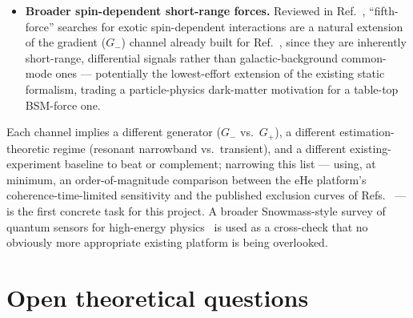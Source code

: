 \documentclass[aps,prxquantum,reprint,superscriptaddress,longbibliography]{revtex4-2}
\begin{document}
\begin{itemize}
  across the trap, combined with a comagnetometer-style oscillating readout, is the standard EDM
  protocol~\cite{aoki2021quantum}; entangled-sensor EDM proposals in trapped-atom systems report
  projected sensitivity below $10^{-30}\,e\cdot{\rm cm}$. This channel is intermediate between the
  original static-gradient proposal (a static source field) and the oscillating targets above (an
  oscillating readout is still required to reject systematics), and would need its own assessment of
  whether the eHe platform's achievable $E$-field and coherence time are competitive.
  \item \textbf{Broader spin-dependent short-range forces.} Reviewed in
  Ref.~\cite{jiang2024searches}, ``fifth-force'' searches for exotic spin-dependent interactions are a
  natural extension of the gradient ($G_-$) channel already built for Ref.~\cite{perruzza2026}, since
  they are inherently short-range, differential signals rather than galactic-background common-mode
  ones — potentially the lowest-effort extension of the existing static formalism, trading a
  particle-physics dark-matter motivation for a table-top BSM-force one.
\end{itemize}

Each channel implies a different generator ($G_-$ vs.\ $G_+$), a different estimation-theoretic
regime (resonant narrowband vs.\ transient), and a different existing-experiment baseline to beat or
complement; narrowing this list — using, at minimum, an order-of-magnitude comparison between the
eHe platform's coherence-time-limited sensitivity and the published exclusion curves of
Refs.~\cite{budker2014proposal,ouellet2019design,salemi2021search,silvafeaver2017design,afach2021search,afach2023gnome,beadle2025nmr}
— is the first concrete task for this project. A broader Snowmass-style survey of quantum sensors for
high-energy physics~\cite{cecil2022snowmass} is used as a cross-check that no obviously more
appropriate existing platform is being overlooked.

\section{Open theoretical questions}
\label{sec:open}
\end{document}
